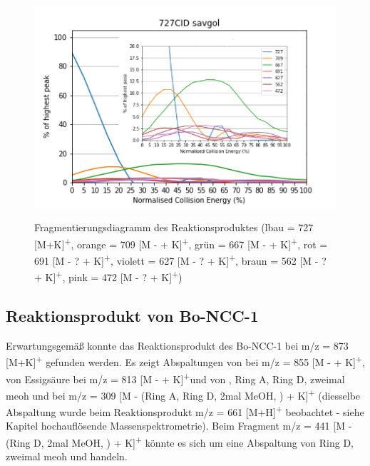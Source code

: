 \begin{figure}[!htbp]
  \centering
  \includegraphics[scale=0.7]{figures/Kapitel4/Kataboliten/diags/727CID-savgol.png}
  \label{fig:727MKLeafspraydiags}
  \caption[Fragmentierungsdiagramm des Reaktionsproduktes von Bo-DNCC, Quelle: Author]{Fragmentierungsdiagramm des Reaktionsproduktes (lbau = 727 [M+K]\textsuperscript{+}, orange = 709 [M -  + K]\textsuperscript{+}, grün = 667 [M -  + K]\textsuperscript{+}, rot = 691 [M - ? + K]\textsuperscript{+}, violett = 627 [M - ? + K]\textsuperscript{+}, braun = 562 [M - ? + K]\textsuperscript{+}, pink = 472 [M - ? + K]\textsuperscript{+})}
\end{figure}



\subsection{Reaktionsprodukt von Bo-NCC-1}

Erwartungsgemäß konnte das Reaktionsprodukt des Bo-NCC-1 bei m/z = 873 [M+K]\textsuperscript{+} gefunden werden. Es zeigt Abspaltungen von  bei m/z = 855 [M -  + K]\textsuperscript{+}, von Essigsäure bei m/z = 813 [M -  + K]\textsuperscript{+}und von , Ring A, Ring D, zweimal \gls{meoh} und  bei m/z = 309 [M - (Ring A, Ring D, 2mal MeOH, )  + K]\textsuperscript{+} (diesselbe Abspaltung wurde beim Reaktionsprodukt m/z = 661 [M+H]\textsuperscript{+} beobachtet - siehe Kapitel hochauflösende Massenspektrometrie). Beim Fragment m/z = 441 [M - (Ring D, 2mal MeOH, ) + K]\textsuperscript{+} könnte es sich um eine Abspaltung von Ring D, zweimal \gls{meoh} und  handeln. 


